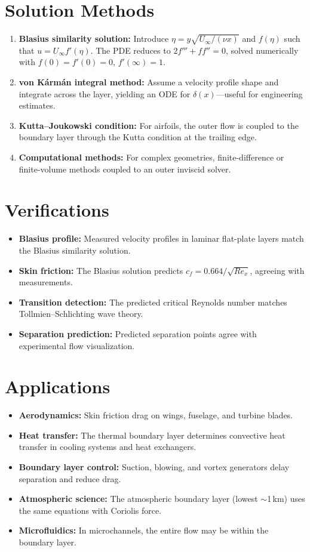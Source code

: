 \documentclass[11pt,openright]{book}
\begin{document}
\section*{Solution Methods}

\begin{enumerate}
\item \textbf{Blasius similarity solution:} Introduce $\eta = y\sqrt{U_\infty / (\nu x)}$ and $f(\eta)$ such that $u = U_\infty f'(\eta)$. The PDE reduces to $2f''' + f f'' = 0$, solved numerically with $f(0) = f'(0) = 0$, $f'(\infty) = 1$.
\item \textbf{von K\'{a}rm\'{a}n integral method:} Assume a velocity profile shape and integrate across the layer, yielding an ODE for $\delta(x)$---useful for engineering estimates.
\item \textbf{Kutta--Joukowski condition:} For airfoils, the outer flow is coupled to the boundary layer through the Kutta condition at the trailing edge.
\item \textbf{Computational methods:} For complex geometries, finite-difference or finite-volume methods coupled to an outer inviscid solver.
\end{enumerate}
\section*{Verifications}

\begin{itemize}
\item \textbf{Blasius profile:} Measured velocity profiles in laminar flat-plate layers match the Blasius similarity solution.
\item \textbf{Skin friction:} The Blasius solution predicts $c_f = 0.664/\sqrt{Re_x}$, agreeing with measurements.
\item \textbf{Transition detection:} The predicted critical Reynolds number matches Tollmien--Schlichting wave theory.
\item \textbf{Separation prediction:} Predicted separation points agree with experimental flow visualization.
\end{itemize}
\section*{Applications}

\begin{itemize}
\item \textbf{Aerodynamics:} Skin friction drag on wings, fuselage, and turbine blades.
\item \textbf{Heat transfer:} The thermal boundary layer determines convective heat transfer in cooling systems and heat exchangers.
\item \textbf{Boundary layer control:} Suction, blowing, and vortex generators delay separation and reduce drag.
\item \textbf{Atmospheric science:} The atmospheric boundary layer (lowest $\sim$1\,km) uses the same equations with Coriolis force.
\item \textbf{Microfluidics:} In microchannels, the entire flow may be within the boundary layer.
\end{itemize}
\end{document}
